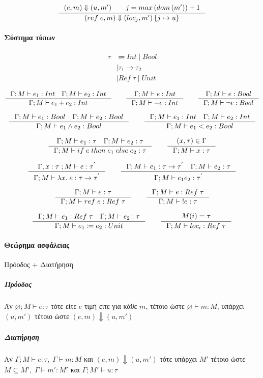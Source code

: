 \documentclass[a4paper,oneside, 12pt, fleqn]{article}
\begin{document}
\[
\inference
{
	(e, m) \Downarrow (u, m')
	\qquad j = max\left(dom\left(m'\right) \right) + 1
}
{(ref\;e, m) \Downarrow (loc_j, 
	m')\left\{j \mapsto u \right\}}
\]

\paragraph*{Σύστημα τύπων}
\begin{align*}
\tau &\Coloneqq Int \mid Bool\\
&\mid \tau_1 \rightarrow \tau_2\\
&\mid Ref\; \tau \mid Unit \\
\end{align*}
\[
\inference
{
	\Gamma; M \vdash e_1 : Int \quad \Gamma; M \vdash e_2 : Int
}
{
	\Gamma; M \vdash e_1 + e_2 : Int
}
\qquad
\inference
{
	\Gamma; M \vdash e : Int
}
{ 
	\Gamma; M \vdash -e : Int
}
\qquad
\inference
{
	\Gamma; M \vdash e : Bool
}
{ 
	\Gamma; M \vdash \neg e : Bool
}
\]

\[
\inference
{
	\Gamma; M \vdash e_1 : Bool \quad \Gamma; M \vdash e_2 : Bool
}
{
	\Gamma; M \vdash e_1 \wedge e_2 : Bool
}
\qquad
\inference
{
	\Gamma; M \vdash e_1 : Int \quad \Gamma; M \vdash e_2 : Int
}
{
	\Gamma; M \vdash e_1 < e_2 : Bool
}
\]

\[
\inference
{
	\Gamma; M \vdash e_1 : \tau \quad \Gamma; M \vdash e_2 : \tau
}
{
	\Gamma; M \vdash if\; e \; then\; e_1\; else\; e_2 : \tau
}
\qquad
\inference
{
	(x, \tau) \in \Gamma
}
{
	\Gamma; M \vdash x : \tau
}
\]

\[
\inference
{
	\Gamma, x:\tau\; ; M \vdash	e : \tau^{'}
}
{
	\Gamma; M \vdash \lambda x.\; e : \tau \rightarrow \tau^{'}
}
\qquad
\inference
{
	\Gamma; M \vdash e_1 : \tau \rightarrow \tau^{'}
	\quad \Gamma; M \vdash e_2 : \tau
}
{
	\Gamma; M \vdash e_1 e_2 : \tau^{'}
}
\]

\[
\inference
{
	\Gamma; M \vdash e : \tau
}
{
	\Gamma; M \vdash ref\; e : Ref\; \tau
}
\qquad
\inference
{
	\Gamma; M \vdash e : Ref\;\tau
}
{
	\Gamma; M \vdash \; !e : \tau
}
\]


\[
\inference
{
	\Gamma; M \vdash e_1 : Ref\; \tau
	\quad \Gamma; M \vdash e_2 : \tau
}
{
	\Gamma; M \vdash e_1 \coloneqq e_2 : Unit
}
\qquad
\inference
{
	M(i) = \tau
}
{
	\Gamma; M \vdash loc_i : Ref\;\tau
}
\]

\paragraph*{Θεώρημα ασφάλειας} Πρόοδος + Διατήρηση
\subparagraph*{Πρόοδος}
Άν $ \varnothing; M \vdash e : \tau$ τότε είτε $e$ τιμή είτε 
για κάθε $m$, τέτοιο ώστε $\varnothing \vdash m : M$, υπάρχει $(u,m')$  τέτοιο ώστε $(e,m) \Downarrow (u,m')$
\subparagraph*{Διατήρηση}
Αν $\Gamma; M \vdash e : \tau,\; \Gamma \vdash m : M$ και $(e,m) \Downarrow (u,m')$
τότε υπάρχει $M'$ τέτοιο ώστε 
$M\subseteq M',\; \Gamma \vdash m' : M'$ και $\Gamma ; M' \vdash u : \tau$
\end{document}
